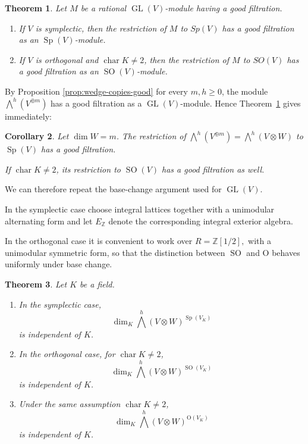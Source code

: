 \documentclass[10pt]{amsart}
\newtheorem{theorem}{Theorem}[section]
\newtheorem{corollary}[theorem]{Corollary}
\theoremstyle{definition}
\theoremstyle{remark}
\newcommand{\GL}{\operatorname{GL}}
\newcommand{\Sp}{\operatorname{Sp}}
\newcommand{\SO}{\operatorname{SO}}
\begin{document}
\begin{theorem}
\label{thm:restriction-good-filtration-classical}
Let \(M\) be a rational \(\GL(V)\)-module having a good filtration.

\begin{enumerate}
\item If \(V\) is symplectic, then the restriction of
\(
M\) to 
\(Sp(V)\)
has a good filtration as an \(\Sp(V)\)-module.

\item If \(V\) is orthogonal and \(\operatorname{char}K\neq2\), then
the restriction of
\(
M\) to 
\(SO(V)\) has a good filtration as an \(\SO(V)\)-module.
\end{enumerate}
\end{theorem}

By Proposition \ref{prop:wedge-copies-good}
for every $m,h\ge0$, the module $
\bigwedge^h(V^{\oplus m})$ has a good filtration
 as a \(\GL(V)\)-module.
Hence Theorem~\ref{thm:restriction-good-filtration-classical} gives
immediately:

\begin{corollary}
\label{cor:classical-good-filtration-exterior}
Let $\dim W=m$. The restriction of \(\bigwedge^h(V^{\oplus m})=\bigwedge^h(V\otimes W)\) to \(\Sp(V)\) has a good filtration.

If \(\operatorname{char}K\neq2\), its restriction to \(\SO(V)\) has a
good filtration as well.
\end{corollary}


We can therefore repeat the base-change argument used for
\(\GL(V)\).\smallskip

In the symplectic case choose integral lattices together with a
unimodular alternating form and let
\(
E_{\mathbb Z}
\)
denote the corresponding integral exterior algebra.  \smallskip



In the
orthogonal case it is convenient to work over
\(
R=\mathbb Z[1/2],
\)
with a unimodular symmetric form, so that the distinction between
\(\SO\) and \(\mathrm O\) behaves uniformly under base change.

\begin{theorem}
\label{thm:classical-field-independence}
Let \(K\) be a field.

\begin{enumerate}
\item In the symplectic case,
\[
\dim_K
\bigwedge^h(V\otimes W)^{\Sp(V_K)}
\]
is independent of \(K\).

\item In the orthogonal case, for
\(\operatorname{char}K\neq2\),
\[
\dim_K
\bigwedge^h(V\otimes W)^{\SO(V_K)}
\]
is independent of \(K\).

\item Under the same assumption
\(\operatorname{char}K\neq2\),
\[
\dim_K
\bigwedge^h(V\otimes W)^{\mathrm O(V_K)}
\]
is independent of \(K\).
\end{enumerate}
\end{theorem}
\end{document}
